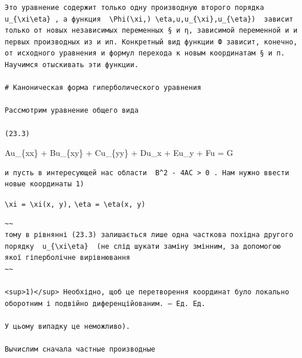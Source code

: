 \documentclass[
  ukrainian,
]{article}
\begin{document}
\begin{verbatim}
Это уравнение содержит только одну производную второго порядка  u_{\xi\eta} , а функция  \Phi(\xi,) \eta,u,u_{\xi},u_{\eta})  зависит только от новых независимых переменных § и η, зависимой переменной и и первых производных из и ип. Конкретный вид функции Ф зависит, конечно, от исходного уравнения и формул перехода к новым координатам § и п. Научимся отыскивать эти функции.

# Каноническая форма гиперболического уравнения

Рассмотрим уравнение общего вида

(23.3)
\end{verbatim}

Au\_\{xx\} + Bu\_\{xy\} + Cu\_\{yy\} + Du\_x + Eu\_y + Fu = G

\begin{verbatim}
и пусть в интересующей нас области  B^2 - 4AC > 0 . Нам нужно ввести новые координаты 1)
\end{verbatim}

\texttt{\textbackslash{}xi\ =\ \textbackslash{}xi(x,\ y),}
\texttt{\textbackslash{}eta\ =\ \textbackslash{}eta(x,\ y)}

\begin{verbatim}
~~
тому в рівнянні (23.3) залишається лише одна часткова похідна другого порядку  u_{\xi\eta}  (не слід шукати заміну змінним, за допомогою якої гіперболічне вирівнювання
~~

<sup>1)</sup> Необхідно, щоб це перетворення координат було локально оборотним і подвійно диференційованим. — Ед. Ед.

У цьому випадку це неможливо).

Вычислим сначала частные производные
\end{verbatim}
\end{document}
